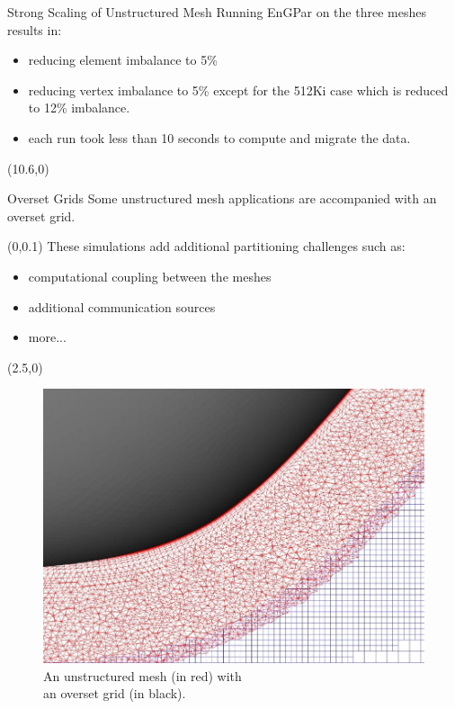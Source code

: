 \documentclass{beamer}
\begin{document}
\begin{textblock}{15.6}
\begin{textblock}{5}
\begin{block}{\centering Strong Scaling of Unstructured Mesh}
      Running EnGPar on the three meshes results in:
      \begin{itemize}
      \item reducing element imbalance to 5\%
      \item reducing vertex imbalance to 5\% except for the 512Ki case which is reduced to 12\% imbalance.
      \item each run took less than 10 seconds to compute and migrate the data.
      \end{itemize}
      
      
    \end{block}
  \end{textblock}
  \begin{textblock}{5}(10.6,0)
    \begin{block}{\centering Overset Grids}
      Some unstructured mesh applications are accompanied with an overset grid.
      \begin{textblock}{2.7}(0,0.1)
        These simulations add additional partitioning challenges such as:
        \begin{itemize}
        \item computational coupling between the meshes
        \item additional communication sources
        \item more...
        \end{itemize}

        

      \end{textblock}
      \begin{textblock}{2.5}(2.5,0)
        \begin{figure}
          \centering
          \includegraphics[height=.6\textwidth]{../figures/overset_grid.jpg}
          \caption{An unstructured mesh (in red) with \\an overset grid (in black).}
        \end{figure}
      \end{textblock}
      \vspace{14cm}


\end{block}
\end{textblock}
\end{textblock}
\end{document}
